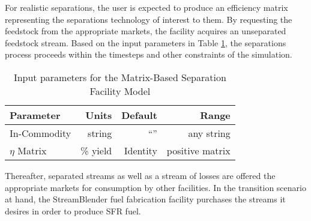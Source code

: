 For realistic separations, the user is expected to produce an efficiency 
matrix representing the separations technology of interest to them. 
By requesting the feedstock from the 
appropriate markets, the facility acquires an unseparated feedstock stream. 
Based on the input parameters  in Table \ref{tab:sepmatrix}, the separations 
process proceeds within the timesteps and other constraints of the simulation. 

\begin{table}[h!]
\centering
\begin{tabular}{|l|r|r|r|}
\hline
\textbf{Parameter} & \textbf{Units} & \textbf{Default} & \textbf{Range}\\ 
\hline
In-Commodity & string &``'' & any string \\
$\eta$ Matrix & \% yield & Identity & positive matrix \\
\hline
\end{tabular}
\caption{Input parameters for the Matrix-Based Separation Facility Model}
\label{tab:sepmatrix}
\end{table}

Thereafter, separated streams as well as a stream of losses are offered the 
appropriate markets for consumption by other facilities. In the transition 
scenario at hand, the StreamBlender fuel fabrication facility purchases the 
streams it desires in order to produce SFR fuel. 
